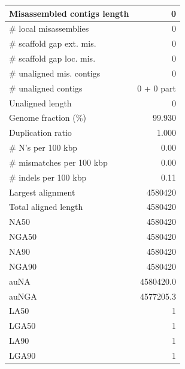 \documentclass[12pt,a4paper]{article}
\begin{document}
\begin{table}[ht]
\begin{center}
\begin{tabular}{|l*{1}{|r}|}
Misassembled contigs length & 0 \\ \hline
\# local misassemblies & 0 \\ \hline
\# scaffold gap ext. mis. & 0 \\ \hline
\# scaffold gap loc. mis. & 0 \\ \hline
\# unaligned mis. contigs & 0 \\ \hline
\# unaligned contigs & 0 + 0 part \\ \hline
Unaligned length & 0 \\ \hline
Genome fraction (\%) & 99.930 \\ \hline
Duplication ratio & 1.000 \\ \hline
\# N's per 100 kbp & 0.00 \\ \hline
\# mismatches per 100 kbp & 0.00 \\ \hline
\# indels per 100 kbp & 0.11 \\ \hline
Largest alignment & 4580420 \\ \hline
Total aligned length & 4580420 \\ \hline
NA50 & 4580420 \\ \hline
NGA50 & 4580420 \\ \hline
NA90 & 4580420 \\ \hline
NGA90 & 4580420 \\ \hline
auNA & 4580420.0 \\ \hline
auNGA & 4577205.3 \\ \hline
LA50 & 1 \\ \hline
LGA50 & 1 \\ \hline
LA90 & 1 \\ \hline
LGA90 & 1 \\ \hline
\end{tabular}
\end{center}
\end{table}
\end{document}

